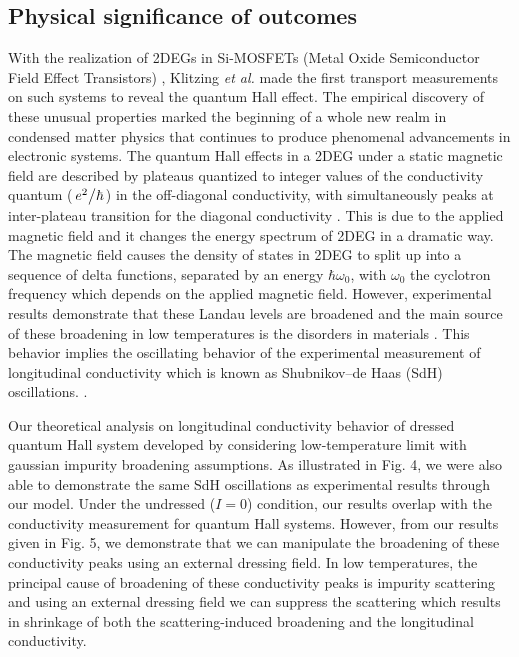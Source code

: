 \documentclass{article}
\begin{document}
{\color{Maroon}
\subsection*{Physical significance of outcomes}

With the realization of 2DEGs in Si-MOSFETs (Metal Oxide Semiconductor Field Effect Transistors) \cite{fowler66}, Klitzing \textit{et al.} \cite{klitzing80} made the first transport measurements on such systems to reveal the quantum Hall effect. The empirical discovery of these unusual properties marked the beginning of a whole new realm in condensed matter physics that continues to produce phenomenal advancements in electronic systems. The quantum Hall effects in a 2DEG under a static magnetic field are described by plateaus quantized to integer values of the conductivity quantum ($\flatfrac{e^2}{\hbar}$) in the off-diagonal conductivity, with simultaneously peaks at inter-plateau transition for the diagonal conductivity \cite{endo09}. This is due to the applied magnetic field and it changes the energy spectrum of 2DEG in a dramatic way. The magnetic field causes the density of states in 2DEG to split up into a sequence of delta functions, separated by an energy $\hbar\omega_0$, with $\omega_0$ the cyclotron frequency which depends on the applied magnetic field.
However, experimental results demonstrate that these Landau levels are broadened and the main source of these broadening in low temperatures is the disorders in materials \cite{ando85,dial07}. This behavior implies the oscillating behavior of the experimental measurement of longitudinal conductivity which is known as Shubnikov–de Haas (SdH) oscillations. \cite{endo09,wakabayashi78}.

Our theoretical analysis on longitudinal conductivity behavior of dressed quantum Hall system developed by considering low-temperature limit with gaussian impurity broadening assumptions. As illustrated in Fig. 4, we were also able to demonstrate the same SdH oscillations as experimental results \cite{endo09,wakabayashi78} through our model. Under the undressed ($I=0$) condition, our results overlap with the conductivity measurement for quantum Hall systems. However, from our results given in Fig. 5, we demonstrate that we can manipulate the broadening of these conductivity peaks using an external dressing field. In low temperatures, the principal cause of broadening of these conductivity peaks is impurity scattering and using an external dressing field we can suppress the scattering which results in shrinkage of both the scattering-induced broadening and the longitudinal conductivity.

}
\end{document}
